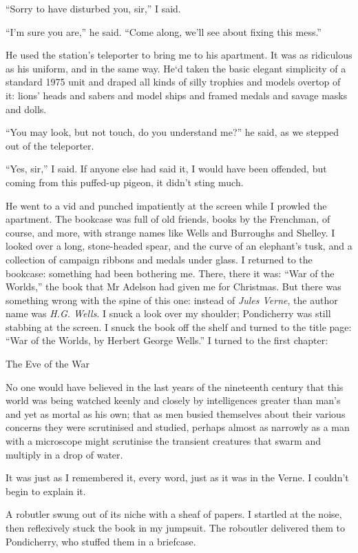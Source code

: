 ``Sorry to have disturbed you, sir,'' I said.

``I'm sure you are,'' he said.
``Come along, we'll see about fixing this mess.''

He used the station's teleporter to bring me to his apartment. It
was as ridiculous as his uniform, and in the same way.
He`d taken the basic elegant simplicity of a standard 1975 unit and draped all 
kinds of silly trophies and models overtop of it: lions'
heads and sabers and model ships and framed medals and savage masks
and dolls.

``You may look, but not touch, do you understand me?'' he said, as
we stepped out of the teleporter.

``Yes, sir,'' I said. If anyone else had said it, I would have been
offended, but coming from this puffed-up pigeon, it didn't sting
much.

He went to a vid and punched impatiently at the screen while I
prowled the apartment. The bookcase was full of old friends, books
by the Frenchman, of course, and more, with strange names like
Wells and Burroughs and Shelley. I looked over a long, stone-headed
spear, and the curve of an elephant's tusk, and a collection of
campaign ribbons and medals under glass. I returned to the
bookcase: something had been bothering me. There, there it was:
``War of the Worlds,'' the book that Mr Adelson had given me for
Christmas. But there was something wrong with the spine of this
one: instead of \emph{Jules Verne}, the author name was
\emph{H.G. Wells}. I snuck a look over my shoulder; Pondicherry was
still stabbing at the screen. I snuck the book off the shelf and
turned to the title page:
``War of the Worlds, by Herbert George Wells.'' I turned to the
first chapter:

The Eve of the War

No one would have believed in the last years of the nineteenth
century that this world was being watched keenly and closely by
intelligences greater than man's and yet as mortal as his own; that
as men busied themselves about their various concerns they were
scrutinised and studied, perhaps almost as narrowly as a man with a
microscope might scrutinise the transient creatures that swarm and
multiply in a drop of water.

It was just as I remembered it, every word, just as it was in the
Verne. I couldn't begin to explain it.

A robutler swung out of its niche with a sheaf of papers. I
startled at the noise, then reflexively stuck the book in my
jumpsuit. The roboutler delivered them to Pondicherry, who stuffed
them in a briefcase.

